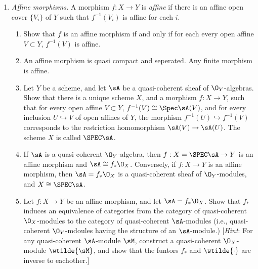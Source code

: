 \documentclass[12pt]{amsart}
\begin{document}
\begin{enumerate}
  \item[5.17.] {
      \emph{Affine morphisms.} A morphism $f:X\to Y$ is \emph{affine} if there is an affine open cover $\{V_i\}$ of $Y$ such that $f^{-1}(V_i)$ is affine for each $i$.
      \begin{enumerate}
        \item Show that $f$ is an affine morphism if and only if for each every open affine $V\subset Y$, $f^{-1}(V)$ is affine.
        \item An affine morphism is quasi compact and seperated.
          Any finite morphism is affine.
        \item Let $Y$ be a scheme, and let $\sA$ be a quasi-coherent sheaf of $\O_Y$-algebras.
          Show that there is a unique scheme $X$, and a morphism $f:X\to Y$, such that for every open affine $V\subset Y$, $f^{-1}(V)\cong \Spec\sA(V)$, and for every inclusion $U\hookrightarrow V$ of open affines of $Y$, the morphism $f^{-1}(U)\hookrightarrow f^{-1}(V)$ corresponds to the restriction homomorphism $\sA(V)\to \sA(U)$.
          The scheme $X$ is called $\SPEC \sA$.
        \item If $\sA$ is a quasi-coherent $\O_Y$-algebra, then $f:X=\SPEC\sA\to Y$ is an affine morphism and $\sA\cong f_*\O_X$.
          Conversely, if $f:X\to Y$ is an affine morphism, then $\sA=f_*\O_X$ is a quasi-coherent sheaf of $\O_Y$-modules, and $X\cong \SPEC\sA$.
        \item Let $f:X\to Y$ be an affine morphism, and let $\sA=f_*\O_X$.
          Show that $f_*$ induces an equivalence of categories from the category of quasi-coherent $\O_X$-modules to the category of quasi-coherent $\sA$-modules (i.e., quasi-coherent $\O_Y$-mdoules having the structure of an $\sA$-module.)
          [\emph{Hint}: For any quasi-coherent $\sA$-module $\sM$, construct a quasi-coherent $\O_X$-module $\wtilde{\sM}$, and show that the funtors $f_*$ and $\wtilde{\cdot}$ are inverse to eachother.]
      \end{enumerate}
    }
\end{enumerate}
\end{document}
